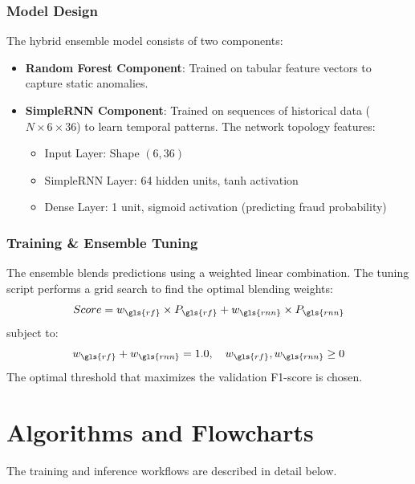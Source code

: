 \subsubsection{Model Design}
The hybrid ensemble model consists of two components:
\begin{itemize}
    \item \textbf{Random Forest Component}: Trained on tabular feature vectors to capture static anomalies.
    \item \textbf{SimpleRNN Component}: Trained on sequences of historical data ($N \times 6 \times 36$) to learn temporal patterns. The network topology features:
    \begin{itemize}
        \item Input Layer: Shape $(6, 36)$
        \item SimpleRNN Layer: 64 hidden units, tanh activation
        \item Dense Layer: 1 unit, sigmoid activation (predicting fraud probability)
    \end{itemize}
\end{itemize}

\subsubsection{Training \& Ensemble Tuning}
The ensemble blends predictions using a weighted linear combination. The tuning script performs a grid search to find the optimal blending weights:
\begin{equation}
    Score = w_{\gls{rf}} \times P_{\gls{rf}} + w_{\gls{rnn}} \times P_{\gls{rnn}}
\end{equation}
subject to:
\begin{equation}
    w_{\gls{rf}} + w_{\gls{rnn}} = 1.0, \quad w_{\gls{rf}}, w_{\gls{rnn}} \ge 0
\end{equation}
The optimal threshold that maximizes the validation F1-score is chosen.

\section{Algorithms and Flowcharts}

The training and inference workflows are described in detail below.

